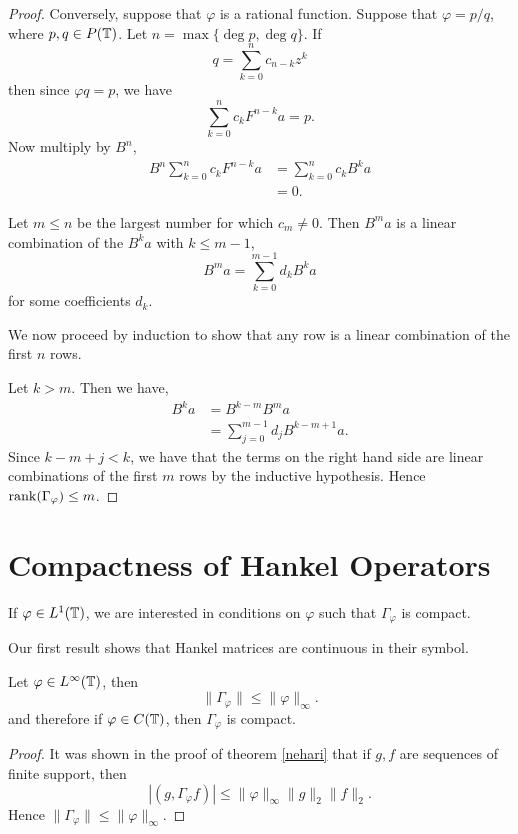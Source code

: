 \begin{proof}
    Conversely, suppose that $\varphi$ is a rational function. Suppose
    that $\varphi = p/q$, where $p,q \in P(\mathbb{T})$. 
    Let $n = \max\{\deg p,\deg q\}$.
    If 
    \begin{equation*}
        q = \sum_{k=0}^n c_{n-k}z^k
    \end{equation*}
    then since $\varphi q = p$, we have
    \begin{equation*}
        \sum_{k=0}^n c_k F^{n-k} a = p.
    \end{equation*}
    Now multiply by $B^n$,
    \begin{align*}
        B^n\sum_{k=0}^n  c_k F^{n-k} a &= \sum_{k=0}^n c_k B^k a\\
        &= 0.
    \end{align*}
    
    Let $m \leq n$ be the largest number for which $c_m \neq 0$. Then $B^m a$
    is a linear combination of the $B^k a$ with $k \leq m-1$,
    \begin{equation*}
        B^m a = \sum_{k=0}^{m-1} d_k B^k a
    \end{equation*}
    for some coefficients $d_k$. 
    
    We now proceed by induction to show that any row is a linear combination
    of the first $n$ rows. 
    
    Let $k > m$. Then we have,
    \begin{align*}
        B^k a &= B^{k-m} B^m a\\
        &= \sum_{j=0}^{m-1} d_j B^{k-m+1}a.
    \end{align*}
    Since $k-m+j < k$, we have that the terms on the right hand side are
    linear combinations of the first $m$ rows by the inductive hypothesis.
    Hence $\operatorname{rank}(\Gamma_\varphi) \leq m$. 
\end{proof}

\section{Compactness of Hankel Operators}
If $\varphi \in L^1(\mathbb{T})$, we are interested in conditions
on $\varphi$ such that $\Gamma_\varphi$ is compact. 

Our first result shows that Hankel matrices are continuous in their symbol.
\begin{proposition}
    Let $\varphi \in L^\infty(\mathbb{T})$, then
    \begin{equation*}
        \|\Gamma_\varphi\| \leq \|\varphi\|_\infty.
    \end{equation*}
    and therefore if $\varphi \in C(\mathbb{T})$, then $\Gamma_\varphi$ is compact.
\end{proposition}
\begin{proof}
    It was shown in the proof of theorem \ref{nehari} that if $g,f$ are sequences
    of finite support, then
    \begin{equation*}
        |(g,\Gamma_\varphi f)| \leq \|\varphi\|_\infty \|g\|_2\|f\|_2.
    \end{equation*}
    Hence $\|\Gamma_\varphi\| \leq \|\varphi\|_\infty$.
\end{proof}

